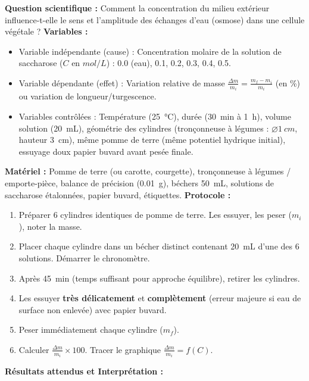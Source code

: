\documentclass[11pt]{article}
\begin{document}
\begin{methode}
\textbf{Question scientifique :} Comment la concentration du milieu extérieur influence-t-elle le sens et l'amplitude des échanges d'eau (osmose) dans une cellule végétale ?
\textbf{Variables :}
\begin{itemize}
    \item Variable indépendante (cause) : Concentration molaire de la solution de saccharose ($C$ en $\si{mol/L}$) : \num{0,0} (eau), \num{0,1}, \num{0,2}, \num{0,3}, \num{0,4}, \num{0,5}.
    \item Variable dépendante (effet) : Variation relative de masse $\frac{\Delta m}{m_i} = \frac{m_f - m_i}{m_i}$ (en \%) ou variation de longueur/turgescence.
    \item Variables contrôlées : Température (\SI{25}{\celsius}), durée (\SI{30}{\minute} à \SI{1}{\hour}), volume solution (\SI{20}{mL}), géométrie des cylindres (tronçonneuse à légumes : $\varnothing \SI{1}{cm}$, hauteur \SI{3}{cm}), même pomme de terre (même potentiel hydrique initial), essuyage doux papier buvard avant pesée finale.
\end{itemize}
\textbf{Matériel :} Pomme de terre (ou carotte, courgette), tronçonneuse à légumes / emporte-pièce, balance de précision (\SI{0,01}{g}), béchers \SI{50}{mL}, solutions de saccharose étalonnées, papier buvard, étiquettes.
\textbf{Protocole :}
\begin{enumerate}
    \item Préparer \num{6} cylindres identiques de pomme de terre. Les essuyer, les peser ($m_i$), noter la masse.
    \item Placer chaque cylindre dans un bécher distinct contenant \SI{20}{mL} d'une des \num{6} solutions. Démarrer le chronomètre.
    \item Après \SI{45}{\minute} (temps suffisant pour approche équilibre), retirer les cylindres.
    \item Les essuyer \textbf{très délicatement} et \textbf{complètement} (erreur majeure si eau de surface non enlevée) avec papier buvard.
    \item Peser immédiatement chaque cylindre ($m_f$).
    \item Calculer $\frac{\Delta m}{m_i} \times 100$. Tracer le graphique $\frac{\Delta m}{m_i} = f(C)$.
\end{enumerate}
\textbf{Résultats attendus et Interprétation :}
\begin{itemize}

\end{itemize}
\end{methode}
\end{document}
